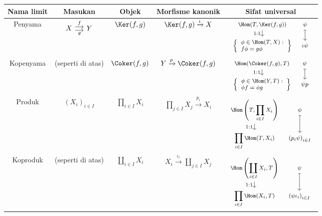 \begin{center}\small\setlength{\tabcolsep}{2.5pt}\begin{tabular}{|c|c|c|c|c|} \hline
	Nama limit & Masukan & Objek & Morfisme kanonik & Sifat universal \\ \hline
	Penyama & $\begin{tikzcd}[column sep=small] X \arrow[shift left, r, "f"] \arrow[shift right, r, "g"'] & Y\end{tikzcd}$ & $\Ker(f,g)$ & $\Ker(f,g) \xrightarrow{\iota} X$ & $\begin{tikzcd}[row sep=small, column sep=tiny, every cell/.append style={font = \footnotesize}]
		\Hom(T, \Ker(f,g)) \arrow[d, "1:1"'] & \psi \arrow[mapsto, d] \\
		\left\{\begin{array}{l} \phi \in \Hom(T, X): \\ f\phi = g\phi \end{array}\right\} & \iota\psi
	\end{tikzcd}$ \\
	Kopenyama & (seperti di atas) & $\Coker(f,g)$ & $Y \xrightarrow{p} \Coker(f,g)$ & $\begin{tikzcd}[row sep=small, column sep=tiny, every cell/.append style={font = \footnotesize}]
		\Hom(\Coker(f,g), T) \arrow[d, "1:1"'] & \psi \arrow[mapsto, d] \\
		\left\{\begin{array}{l} \phi \in \Hom(Y, T): \\ \phi f = \phi g \end{array}\right\} & \psi p
	\end{tikzcd}$ \\
	Produk & $(X_i)_{i \in I}$ & $\displaystyle\prod_{i \in I} X_i$ & $\displaystyle\prod_{j \in I} X_j \xrightarrow{p_i} X_i$ & $\begin{tikzcd}[row sep=small, column sep=tiny, every cell/.append style={font = \footnotesize}]
		\Hom\left(T, \displaystyle\prod_{i \in I} X_i \right) \arrow[d, "1:1"'] & \psi \arrow[mapsto, d] \\
		\displaystyle\prod_{i \in I} \Hom(T, X_i) & \left( p_i \psi \right)_{i \in I}
	\end{tikzcd}$ \\
	Koproduk & (seperti di atas) & $\displaystyle\coprod_{i \in I} X_i$ & $X_i \xrightarrow{\iota_i} \displaystyle\coprod_{j \in I} X_j$ & $\begin{tikzcd}[row sep=small, column sep=tiny, every cell/.append style={font = \footnotesize}]
		\Hom\left(\displaystyle\coprod_{i \in I} X_i, T \right) \arrow[d, "1:1"'] & \psi \arrow[mapsto, d] \\
		\displaystyle\prod_{i \in I} \Hom(X_i, T) & \left( \psi \iota_i \right)_{i \in I}
	\end{tikzcd}$ \\ \hline
\end{tabular}\end{center}

